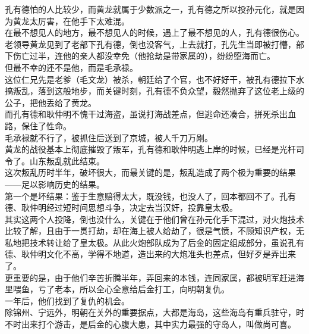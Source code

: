 \begin{multicols}{\theparacolNo}
孔有德怕的人比较少，而黄龙就属于少数派之一，孔有德之所以投孙元化，就是因为黄龙太厉害，在他手下太难混。\\

在最不想见人的地方，最不想见人的时候，遇上了最不想见的人，孔有德很伤心。\\

老领导黄龙见到了老部下孔有德，倒也没客气，上去就打，孔先生当即被打懵，部下伤亡过半，连他的亲人都没幸免（他抢劫是带家属的），纷纷堕海而亡。\\

但最不幸的还不是他，而是毛承禄。\\

这位仁兄先是老爹（毛文龙）被杀，朝廷给了个官，也不好好干，被孔有德拉下水搞叛乱，落到这般地步，而关键时刻，孔有德不负众望，毅然抛弃了这位老上级的公子，把他丢给了黄龙。\\

而孔有德和耿仲明不愧干过海盗，虽说打海战差点，但逃命还凑合，拼死杀出血路，保住了性命。\\

毛承禄就不行了，被抓住后送到了京城，被人千刀万剐。\\

黄龙的战役基本上彻底摧毁了叛军，孔有德和耿仲明逃上岸的时候，已经是光杆司令了。山东叛乱就此结束。\\

这次叛乱历时半年，破坏很大，而最关键的是，叛乱造成了两个极为重要的结果——足以影响历史的结果。\\

第一个是坏结果：鉴于生意赔得太大，既没钱，也没人了，回本都回不了。孔有德、耿仲明经过短时间思想斗争，决定去当汉奸，投靠皇太极。\\

其实这两个人投降，倒也没什么，关键在于他们曾在孙元化手下混过，对火炮技术比较了解，且由于一贯打劫，却在海上被人给劫了，很是气愤，不顾知识产权，无私地把技术转让给了皇太极。从此火炮部队成为了后金的固定组成部分，虽说孔有德、耿仲明文化不高，学得不地道，造出来的大炮准头也差点，但好歹是弄出来了。\\

更重要的是，由于他们辛苦折腾半年，弄回来的本钱，连同家属，都被明军赶进海里喂鱼，亏了老本，所以全心全意给后金打工，向明朝复仇。\\

一年后，他们找到了复仇的机会。\\

除锦州、宁远外，明朝在关外的重要据点，大都是海岛，这些海岛有重兵驻守，时不时出来打个游击，是后金的心腹大患，其中实力最强的守岛人，叫做尚可喜。\\


\end{multicols}
